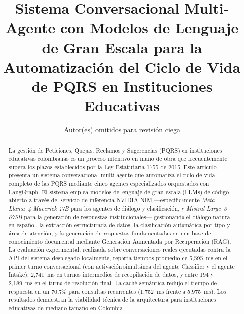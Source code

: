 \documentclass[runningheads]{llncs}
\begin{document}
\title{Sistema Conversacional Multi-Agente con Modelos de Lenguaje de Gran Escala para la Automatización del Ciclo de Vida de PQRS en Instituciones Educativas}


\author{Autor(es) omitidos para revisión ciega}
\institute{}

\maketitle

\begin{abstract}
La gestión de Peticiones, Quejas, Reclamos y Sugerencias (PQRS) en instituciones educativas colombianas es un proceso intensivo en mano de obra que frecuentemente supera los plazos establecidos por la Ley Estatutaria 1755 de 2015. Este artículo presenta un sistema conversacional multi-agente que automatiza el ciclo de vida completo de las PQRS mediante cinco agentes especializados orquestados con LangGraph. El sistema emplea modelos de lenguaje de gran escala (LLMs) de código abierto a través del servicio de inferencia NVIDIA NIM —específicamente \textit{Meta Llama~4 Maverick 17B} para los agentes de diálogo y clasificación, y \textit{Mistral Large~3 675B} para la generación de respuestas institucionales— gestionando el diálogo natural en español, la extracción estructurada de datos, la clasificación automática por tipo y área de atención, y la generación de respuestas fundamentadas en una base de conocimiento documental mediante Generación Aumentada por Recuperación (RAG). La evaluación experimental, realizada sobre conversaciones reales ejecutadas contra la API del sistema desplegado localmente, reporta tiempos promedio de 5{,}595~ms en el primer turno conversacional (con activación simultánea del agente Classifier y el agente Intake), 2{,}741~ms en turnos intermedios de recopilación de datos, y entre 194 y 2{,}189~ms en el turno de resolución final. La caché semántica redujo el tiempo de respuesta en un 70{,}7\% para consultas recurrentes (1{,}752~ms frente a 5{,}975~ms). Los resultados demuestran la viabilidad técnica de la arquitectura para instituciones educativas de mediano tamaño en Colombia.
\end{abstract}
\end{document}
